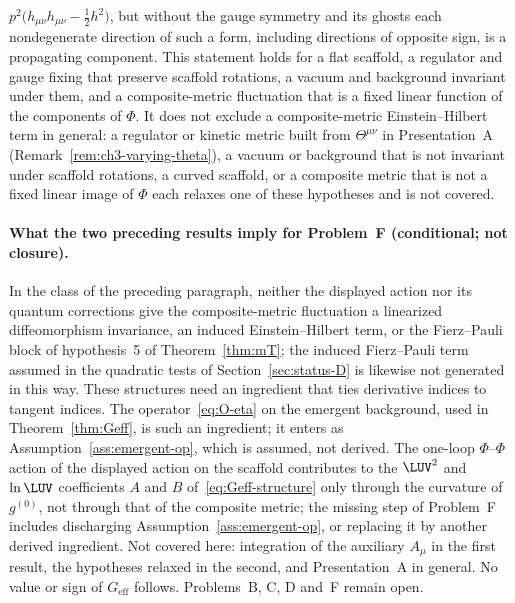 \(p^2\bigl(h_{\mu\nu}h_{\mu\nu}-\tfrac12h^2\bigr)\), but without the
gauge symmetry and its ghosts each nondegenerate direction of such a
form, including directions of opposite sign, is a propagating
component. This statement holds for a flat scaffold, a regulator and
gauge fixing that preserve scaffold rotations, a vacuum and background
invariant under them, and a composite-metric fluctuation that is a
fixed linear function of the components of \(\Phi\). It does not
exclude a composite-metric Einstein--Hilbert term in general: a
regulator or kinetic metric built from \(\Theta^{\mu\nu}\) in
Presentation~A (Remark~\ref{rem:ch3-varying-theta}), a vacuum or
background that is not invariant under scaffold rotations, a curved
scaffold, or a composite metric that is not a fixed linear image of
\(\Phi\) each relaxes one of these hypotheses and is not covered.

\paragraph{What the two preceding results imply for Problem~F (conditional; not closure).}
In the class of the preceding paragraph, neither the displayed action
nor its quantum corrections give the composite-metric fluctuation a
linearized diffeomorphism invariance, an induced Einstein--Hilbert
term, or the Fierz--Pauli block of hypothesis~5 of
Theorem~\ref{thm:mT}; the induced Fierz--Pauli term assumed in the
quadratic tests of Section~\ref{sec:status-D} is likewise not
generated in this way. These structures need an ingredient that ties
derivative indices to tangent indices. The
operator~\eqref{eq:O-eta} on the emergent background, used in
Theorem~\ref{thm:Geff}, is such an ingredient; it enters as
Assumption~\ref{ass:emergent-op}, which is assumed, not derived. The
one-loop \(\Phi\)--\(\Phi\) action of the displayed action on the
scaffold contributes to the \(\LUV^2\) and \(\ln\LUV\) coefficients
\(A\) and \(B\) of~\eqref{eq:Geff-structure} only through the curvature
of \(g^{(0)}\), not through that of the composite metric; the missing
step of Problem~F includes discharging
Assumption~\ref{ass:emergent-op}, or replacing it by another derived
ingredient. Not covered here: integration of the auxiliary \(A_\mu\) in
the first result, the hypotheses relaxed in the second, and
Presentation~A in general. No value or sign of \(G_{\mathrm{eff}}\)
follows. Problems~B, C, D and~F remain open.

